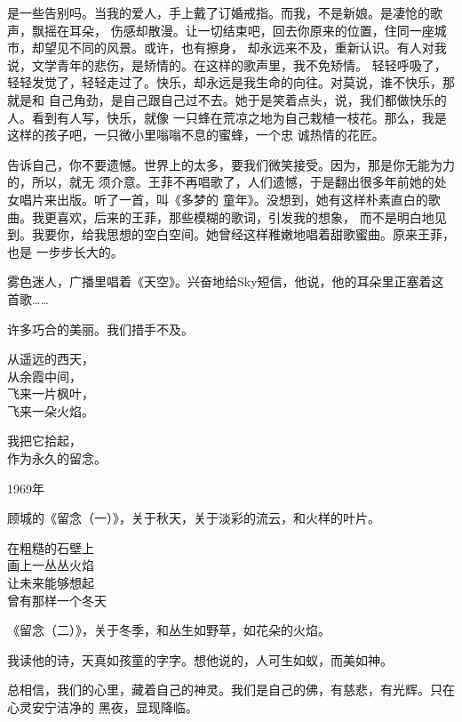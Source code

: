 		是一些告别吗。当我的爱人，手上戴了订婚戒指。而我，不是新娘。是凄怆的歌声，飘摇在耳朵，
	伤感却散漫。让一切结束吧，回去你原来的位置，住同一座城市，却望见不同的风景。或许，也有擦身，
	却永远来不及，重新认识。有人对我说，文学青年的悲伤，是矫情的。在这样的歌声里，我不免矫情。
	轻轻呼吸了，轻轻发觉了，轻轻走过了。快乐，却永远是我生命的向往。对莫说，谁不快乐，那就是和
	自己角劲，是自己跟自己过不去。她于是笑着点头，说，我们都做快乐的人。看到有人写，快乐，就像
	一只蜂在荒凉之地为自己栽植一枝花。那么，我是这样的孩子吧，一只微小里嗡嗡不息的蜜蜂，一个忠
	诚热情的花匠。

		告诉自己，你不要遗憾。世界上的太多，要我们微笑接受。因为，那是你无能为力的，所以，就无
	须介意。王菲不再唱歌了，人们遗憾，于是翻出很多年前她的处女唱片来出版。听了一首，叫《多梦的
	童年》。没想到，她有这样朴素直白的歌曲。我更喜欢，后来的王菲，那些模糊的歌词，引发我的想象，
	而不是明白地见到。我要你，给我思想的空白空间。她曾经这样稚嫩地唱着甜歌蜜曲。原来王菲，也是
	一步步长大的。

		雾色迷人，广播里唱着《天空》。兴奋地给Sky短信，他说，他的耳朵里正塞着这首歌……

		许多巧合的美丽。我们措手不及。

	\endwriting



		\longpoem{}{}{}
			从遥远的西天，\\
			从余霞中间，\\
			飞来一片枫叶，\\
			飞来一朵火焰。

			我把它拾起，\\
			作为永久的留念。

			\hspace{4em} 1969年
		\endlongpoem

		顾城的《留念（一）》，关于秋天，关于淡彩的流云，和火样的叶片。

		\longpoem{}{}{}
			在粗糙的石壁上 \\
			画上一丛丛火焰 \\
			让未来能够想起 \\
			曾有那样一个冬天
		\endlongpoem

		《留念（二）》，关于冬季，和丛生如野草，如花朵的火焰。

		我读他的诗，天真如孩童的字字。想他说的，人可生如蚁，而美如神。

		总相信，我们的心里，藏着自己的神灵。我们是自己的佛，有慈悲，有光辉。只在心灵安宁洁净的
	黑夜，显现降临。

